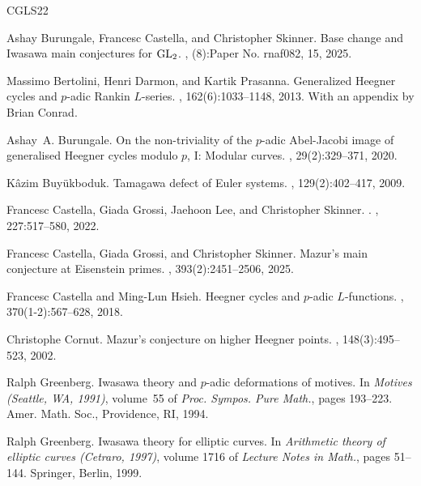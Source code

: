 \documentclass[10pt,reqno]{amsart}
\numberwithin{equation}{section}
\theoremstyle{plain}
\theoremstyle{definition}
\theoremstyle{definition}
\theoremstyle{plain}
\theoremstyle{plain}
\theoremstyle{plain}
\theoremstyle{plain}
\theoremstyle{plain}
\theoremstyle{plain}
\begin{document}
\begin{thebibliography}{CGLS22}

Ashay Burungale, Francesc Castella, and Christopher Skinner.
\newblock Base change and {I}wasawa main conjectures for {${\rm GL}_2$}.
, (8):Paper No. rnaf082, 15, 2025.

Massimo Bertolini, Henri Darmon, and Kartik Prasanna.
\newblock Generalized {H}eegner cycles and {$p$}-adic {R}ankin {$L$}-series.
, 162(6):1033--1148, 2013.
\newblock With an appendix by Brian Conrad.

Ashay~A. Burungale.
\newblock On the non-triviality of the {$p$}-adic {A}bel-{J}acobi image of
  generalised {H}eegner cycles modulo {$p$}, {I}: {M}odular curves.
, 29(2):329--371, 2020.

K\^{a}zim Buy\"{u}kboduk.
\newblock Tamagawa defect of {E}uler systems.
, 129(2):402--417, 2009.

Francesc Castella, Giada Grossi, Jaehoon Lee, and Christopher Skinner.
.
, 227:517–580, 2022.

Francesc Castella, Giada Grossi, and Christopher Skinner.
\newblock Mazur's main conjecture at {E}isenstein primes.
, 393(2):2451--2506, 2025.

Francesc Castella and Ming-Lun Hsieh.
\newblock Heegner cycles and {$p$}-adic {$L$}-functions.
, 370(1-2):567--628, 2018.

Christophe Cornut.
\newblock Mazur's conjecture on higher {H}eegner points.
, 148(3):495--523, 2002.

Ralph Greenberg.
\newblock Iwasawa theory and {$p$}-adic deformations of motives.
\newblock In {\em Motives ({S}eattle, {WA}, 1991)}, volume~55 of {\em Proc.
  Sympos. Pure Math.}, pages 193--223. Amer. Math. Soc., Providence, RI, 1994.

Ralph Greenberg.
\newblock Iwasawa theory for elliptic curves.
\newblock In {\em Arithmetic theory of elliptic curves ({C}etraro, 1997)},
  volume 1716 of {\em Lecture Notes in Math.}, pages 51--144. Springer, Berlin,
  1999.


\end{thebibliography}
\end{document}
